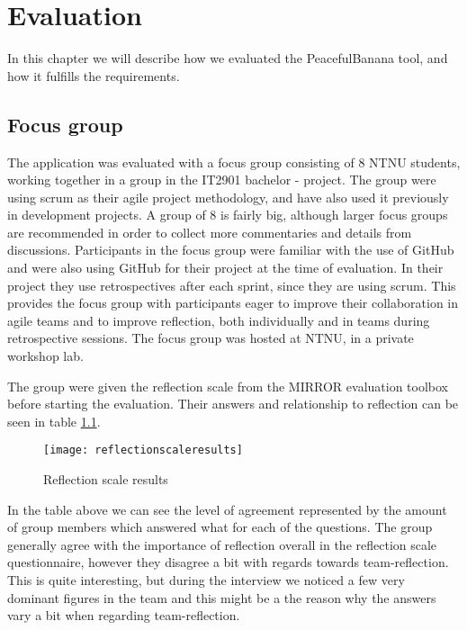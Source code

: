 \chapter{Evaluation}
In this chapter we will describe how we evaluated the PeacefulBanana tool, and how it fulfills the requirements.




\section{Focus group}
The application was evaluated with a focus group consisting of 8 NTNU students, working together in a group in the IT2901 bachelor - project. The group were using scrum as their agile project methodology, and have also used it previously in development projects. A group of 8 is fairly big, although larger focus groups are recommended in order to collect more commentaries and details from discussions\citep{morgan1998planning}. Participants in the focus group were familiar with the use of GitHub and were also using GitHub for their project at the time of evaluation. In their project they use retrospectives after each sprint, since they are using scrum. This provides the focus group with participants eager to improve their collaboration in agile teams and to improve reflection, both individually and in teams during retrospective sessions. The focus group was hosted at NTNU, in a private workshop lab. 

The group were given the reflection scale from the MIRROR evaluation toolbox before starting the evaluation. Their answers and relationship to reflection can be seen in table \ref{reflectionscaleresults}. 
\begin{figure}[H]
\centering
	\texttt{[image: reflectionscaleresults]}
\caption{Reflection scale results}
\label{reflectionscaleresults}
\end{figure}
In the table above we can see the level of agreement represented by the amount of group members which answered what for each of the questions. The group generally agree with the importance of reflection overall in the reflection scale questionnaire, however they disagree a bit with regards towards team-reflection. This is quite interesting, but during the interview we noticed a few very dominant figures in the team and this might be a the reason why the answers vary a bit when regarding team-reflection.

